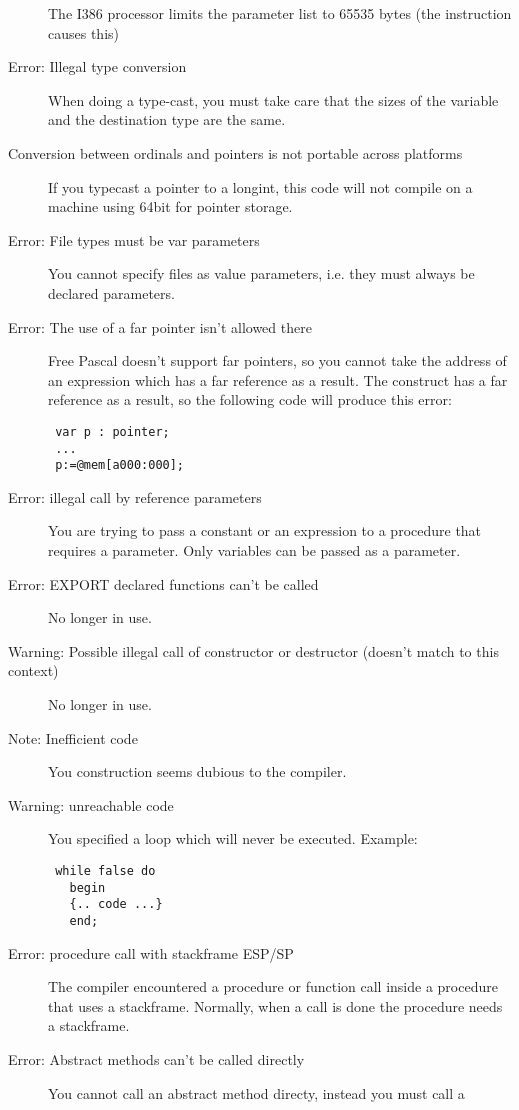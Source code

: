 \begin{description}
 The I386 processor limits the parameter list to 65535 bytes (the 
 instruction causes this)
\item [Error: Illegal type conversion]
 When doing a type-cast, you must take care that the sizes of the variable and
 the destination type are the same.
\item [Conversion between ordinals and pointers is not portable across platforms]
 If you typecast a pointer to a longint, this code will not compile
 on a machine using 64bit for pointer storage.
\item [Error: File types must be var parameters]
 You cannot specify files as value parameters, i.e. they must always be
 declared  parameters.
\item [Error: The use of a far pointer isn't allowed there]
 Free Pascal doesn't support far pointers, so you cannot take the address of
 an expression which has a far reference as a result. The  construct
 has a far reference as a result, so the following code will produce this
 error:
 \begin{verbatim}
 var p : pointer;
 ...
 p:=@mem[a000:000];
 \end{verbatim}
\item [Error: illegal call by reference parameters]
 You are trying to pass a constant or an expression to a procedure that
 requires a  parameter. Only variables can be passed as a 
 parameter.
\item [Error: EXPORT declared functions can't be called]
 No longer in use.
\item [Warning: Possible illegal call of constructor or destructor (doesn't match to this context)]
 No longer in use.
\item [Note: Inefficient code]
 You construction seems dubious to the compiler.
\item [Warning: unreachable code]
 You specified a loop which will never be executed. Example:
 \begin{verbatim}
 while false do
   begin
   {.. code ...}
   end;
 \end{verbatim}
\item [Error: procedure call with stackframe ESP/SP]
 The compiler encountered a procedure  or function call inside a
 procedure that uses a  stackframe. Normally, when a call is
 done the procedure needs a  stackframe.
\item [Error: Abstract methods can't be called directly]
 You cannot call an abstract method directy, instead you must call a

\end{description}
